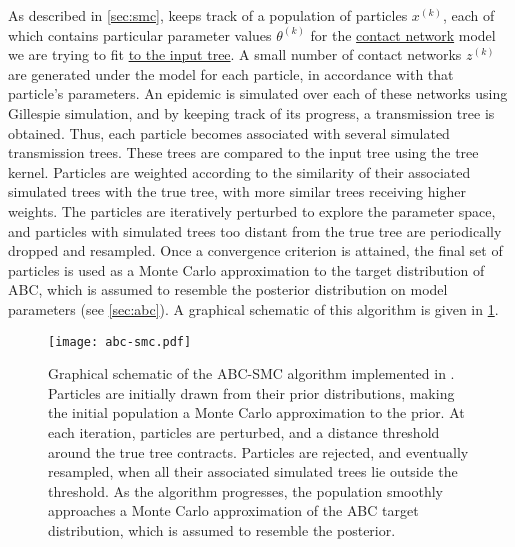 As described in \cref{sec:smc},  keeps track of a population
of particles $x^{(k)}$, each of which contains particular parameter values
$\theta^{(k)}$ for the {\color{blue}\uline{contact network}} model we are
trying to fit {\color{blue}\uline{to the input tree}}. A small number of
contact networks $z^{(k)}$ are generated under the model for each particle, in
accordance with that particle's parameters. An epidemic is simulated over each
of these networks using Gillespie simulation, and by keeping track of its
progress, a transmission tree is obtained. Thus, each particle becomes
associated with several simulated transmission trees. These trees are compared
to the input tree using the tree kernel. Particles are weighted according to
the similarity of their associated simulated trees with the true tree, with
more similar trees receiving higher weights. The particles are iteratively
perturbed to explore the parameter space, and particles with simulated trees
too distant from the true tree are periodically dropped and resampled. Once a
convergence criterion is attained, the final set of particles is used as a
Monte Carlo approximation to the target distribution of \gls{ABC}, which is
assumed to resemble the posterior distribution on model parameters (see
\cref{sec:abc}). A graphical schematic of this algorithm is given in
\cref{fig:abcsmc}.

\begin{figure}
    \texttt{[image: abc-smc.pdf]}
    \caption[Graphical schematic of the ABC-SMC algorithm implemented in .]{
      Graphical schematic of the \gls{ABC}-\gls{SMC} algorithm implemented in
      . Particles are initially drawn from their prior
      distributions, making the initial population a Monte Carlo approximation
      to the prior. At each iteration, particles are perturbed, and a distance
      threshold around the true tree contracts. Particles are rejected, and
      eventually resampled, when all their associated simulated trees lie
      outside the threshold. As the algorithm progresses, the population
      smoothly approaches a Monte Carlo approximation of the \gls{ABC} target
      distribution, which is assumed to resemble the posterior.
    }
    \label{fig:abcsmc}
\end{figure}

